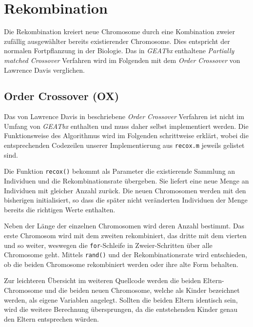 \section{Rekombination}\label{recombination}

Die Rekombination kreiert neue Chromosome durch eine Kombination zweier zufällig
ausgewählter bereits existierender Chromosome. Dies entspricht der normalen
Fortpflanzung in der Biologie.
Das in \emph{GEATbx} enthaltene \emph{Partially matched Crossover} Verfahren
wird im Folgenden mit dem \emph{Order Crossover} von Lawrence Davis verglichen.


\subsection{Order Crossover (OX)}
Das von Lawrence Davis in \citep{ox} beschriebene \emph{Order Crossover} Verfahren ist nicht im
Umfang von \emph{GEATbx} enthalten und muss daher selbst implementiert werden.
Die Funktionsweise des Algorithmus wird im Folgenden schrittweise erklärt, wobei
die entsprechenden Codezeilen unserer Implementierung aus {\tt recox.m}
jeweils gelistet sind.

\newcommand{\recox}[2]{}

Die Funktion {\tt recox()} bekommt als Parameter
die existierende Sammlung an Individuen und die Rekombinationsrate übergeben.
Sie liefert eine neue Menge an Individuen mit
gleicher Anzahl zurück.
Die neuen Chromosomen werden mit den bisherigen initialisiert, so dass die
später nicht veränderten Individuen der Menge bereits die richtigen Werte
enthalten.

\recox{1}{5}

\noindent Neben der Länge der einzelnen Chromosomen wird deren Anzahl bestimmt.
Das erste Chromosom wird mit dem zweiten rekombiniert, das dritte mit dem vierten
und so weiter, weswegen die {\tt for}-Schleife in Zweier-Schritten über alle
Chromosome geht.
Mittels {\tt rand()} und der Rekombinationsrate wird entschieden, ob die beiden
Chromosome rekombiniert werden oder ihre alte Form behalten.

\recox{7}{13}

\noindent Zur leichteren Übersicht im weiteren Quellcode werden die beiden
Eltern-Chromosome und die beiden neuen Chromosome, welche als Kinder bezeichnet
werden, als eigene Variablen angelegt.
Sollten die beiden Eltern identisch sein, wird die weitere Berechnung
übersprungen, da die entstehenden Kinder genau den Eltern entsprechen würden.

